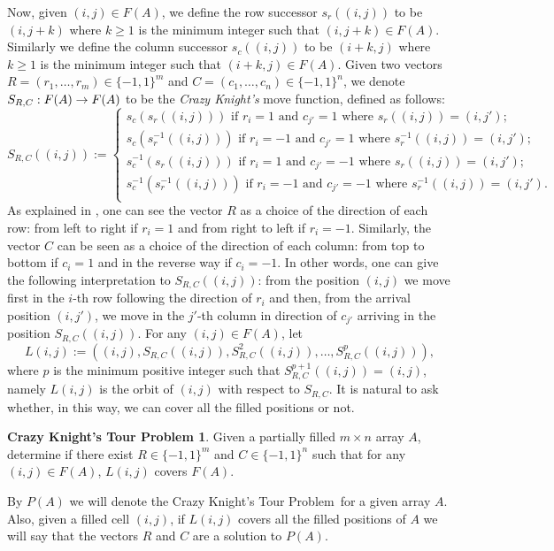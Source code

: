 \documentclass{amsart}
\theoremstyle{definition}
\newtheorem*{KN}{Crazy Knight's Tour Problem}
\numberwithin{equation}{section}
\newcommand{\probname}{Crazy Knight's Tour Problem}
\begin{document}
Now, given  $(i,j)\in F(A)$, we define the row successor $s_r((i,j))$ to be $(i,j+k)$ where $k\geq 1$ is the minimum integer such that $(i,j+k)\in F(A)$.
Similarly we define the column successor $s_c((i,j))$ to be $(i+k,j)$ where $k\geq1$ is the minimum integer such that $(i+k,j)\in F(A)$.
Given two vectors $R=(r_1,\dots,r_m)\in \{-1,1\}^m$ and $C=(c_1,\dots,c_n)\in \{-1,1\}^n$, we denote $S_{\tiny{R,C}}: F(A)\rightarrow F(A)$ to be the \emph{Crazy Knight's} move function, defined as follows:
$$
S_{R,C}((i,j)):=
\begin{cases}
 s_c(s_r((i,j))) \mbox{ if } r_i=1 \mbox{ and } c_{j'}=1 \mbox{ where } s_r((i,j))= (i,j');\\
 s_c(s_r^{-1}((i,j))) \mbox{ if } r_i=-1 \mbox{ and } c_{j'}=1 \mbox{ where } s_r^{-1}((i,j))= (i,j');\\
 s_c^{-1}(s_r((i,j))) \mbox{ if } r_i=1 \mbox{ and } c_{j'}=-1 \mbox{ where } s_r((i,j))= (i,j');\\
 s_c^{-1}(s_r^{-1}((i,j))) \mbox{ if } r_i=-1 \mbox{ and } c_{j'}=-1 \mbox{ where } s_r^{-1}((i,j))= (i,j').\\
\end{cases}
$$
As explained in \cite{CDP}, one can see the vector $R$ as a choice of the direction of each row: from left to right if $r_i=1$ and from right to left if $r_i=-1$.
Similarly, the vector $C$ can be seen as a choice of the direction of each column: from top to bottom if $c_i=1$ and in the reverse way if $c_i=-1$.
In other words, one can give the following interpretation to  $S_{R,C}((i,j))$: from the position $(i,j)$ we move first in the $i$-th row following the direction of $r_i$ and then, from the arrival position $(i,j')$, we move in the $j'$-th column in direction of $c_{j'}$ arriving in the position $S_{R,C}((i,j))$.
For any $(i,j)\in F(A)$, let $$L(i,j):=((i,j),S_{R,C}((i,j)), S_{R,C}^2((i,j)),\dots, S_{R,C}^{p}((i,j))),$$
where $p$ is the minimum positive integer such that $S_{R,C}^{p+1}((i,j))=(i,j)$,
namely $L(i,j)$ is the orbit of $(i,j)$ with respect to $S_{R,C}$. It is natural to ask whether, in this way, we can cover all the filled positions or not.

\begin{KN}\label{Arco}
Given a partially filled $m\times n$ array $A$, determine if there exist $R\in \{-1,1\}^m$ and $C\in \{-1,1\}^n$ such that for any $(i,j) \in F(A)$,  $L(i,j)$ covers $F(A)$.
\end{KN}
By $P(A)$ we will denote the \probname\ for a given array $A$.
Also, given a filled cell $(i,j)$, if $L(i,j)$ covers all the filled positions of $A$ we will say that the vectors $R$ and $C$ are a solution to $P(A)$.
\end{document}
